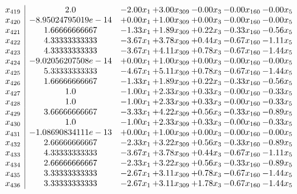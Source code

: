 \documentclass[8pt]{article}
\begin{document}
\[\begin{array}{c| c c@{\hskip 2pt} c@{\hskip 2pt} c@{\hskip 2pt} c@{\hskip 2pt} c@{\hskip 2pt} }
 x_{419}   &  2.0 & -2.00 x_{1} & +  3.00 x_{309} & -0.00 x_{3} & -0.00 x_{160} & -0.00 x_{5}\\
 x_{420}   &  -8.95024795019e-14 & +  0.00 x_{1} & +  1.00 x_{309} & +  0.00 x_{3} & -0.00 x_{160} & -0.00 x_{5}\\
 x_{421}   &  1.66666666667 & -1.33 x_{1} & +  1.89 x_{309} & +  0.22 x_{3} & -0.33 x_{160} & -0.56 x_{5}\\
 x_{422}   &  4.33333333333 & -3.67 x_{1} & +  3.78 x_{309} & +  0.44 x_{3} & -0.67 x_{160} & -1.11 x_{5}\\
 x_{423}   &  4.33333333333 & -3.67 x_{1} & +  4.11 x_{309} & +  0.78 x_{3} & -0.67 x_{160} & -1.44 x_{5}\\
 x_{424}   &  -9.02056207508e-14 & +  0.00 x_{1} & +  1.00 x_{309} & +  0.00 x_{3} & -0.00 x_{160} & -0.00 x_{5}\\
 x_{425}   &  5.33333333333 & -4.67 x_{1} & +  5.11 x_{309} & +  0.78 x_{3} & -0.67 x_{160} & -1.44 x_{5}\\
 x_{426}   &  1.66666666667 & -1.33 x_{1} & +  1.89 x_{309} & +  0.22 x_{3} & -0.33 x_{160} & -0.56 x_{5}\\
 x_{427}   &  1.0 & -1.00 x_{1} & +  2.33 x_{309} & +  0.33 x_{3} & -0.00 x_{160} & -0.33 x_{5}\\
 x_{428}   &  1.0 & -1.00 x_{1} & +  2.33 x_{309} & +  0.33 x_{3} & -0.00 x_{160} & -0.33 x_{5}\\
 x_{429}   &  3.66666666667 & -3.33 x_{1} & +  4.22 x_{309} & +  0.56 x_{3} & -0.33 x_{160} & -0.89 x_{5}\\
 x_{430}   &  1.0 & -1.00 x_{1} & +  2.33 x_{309} & +  0.33 x_{3} & -0.00 x_{160} & -0.33 x_{5}\\
 x_{431}   &  -1.08690834111e-13 & +  0.00 x_{1} & +  1.00 x_{309} & +  0.00 x_{3} & -0.00 x_{160} & -0.00 x_{5}\\
 x_{432}   &  2.66666666667 & -2.33 x_{1} & +  3.22 x_{309} & +  0.56 x_{3} & -0.33 x_{160} & -0.89 x_{5}\\
 x_{433}   &  4.33333333333 & -3.67 x_{1} & +  3.78 x_{309} & +  0.44 x_{3} & -0.67 x_{160} & -1.11 x_{5}\\
 x_{434}   &  2.66666666667 & -2.33 x_{1} & +  3.22 x_{309} & +  0.56 x_{3} & -0.33 x_{160} & -0.89 x_{5}\\
 x_{435}   &  3.33333333333 & -2.67 x_{1} & +  3.11 x_{309} & +  0.78 x_{3} & -0.67 x_{160} & -1.44 x_{5}\\
 x_{436}   &  3.33333333333 & -2.67 x_{1} & +  3.11 x_{309} & +  1.78 x_{3} & -0.67 x_{160} & -1.44 x_{5}\\

\end{array}\]
\end{document}
